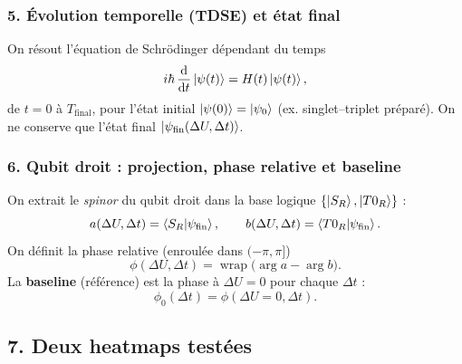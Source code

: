 \documentclass{article}
\begin{document}
\subsubsection*{5. Évolution temporelle (TDSE) et état final}
On résout l’équation de Schrödinger dépendant du temps
\[
i\hbar\,\dv{t}\ket{\psi(t)}=H(t)\ket{\psi(t)},
\]
de $t=0$ à $T_{\text{final}}$, pour l’état initial $\ket{\psi(0)}=\ket{\psi_0}$ (ex. singlet–triplet préparé).
On ne conserve que l’état final $\ket{\psi_{\text{fin}}(\Delta U,\Delta t)}$.

\subsubsection*{6. Qubit droit : projection, phase relative et baseline}
On extrait le \emph{spinor} du qubit droit dans la base logique $\{\ket{S_R},\ket{T0_R}\}$ :
\[
a(\Delta U,\Delta t)=\braket{S_R}{\psi_{\text{fin}}},\qquad
b(\Delta U,\Delta t)=\braket{T0_R}{\psi_{\text{fin}}}.
\]
On définit la phase relative (enroulée dans $(-\pi,\pi]$)
\[
\phi(\Delta U,\Delta t)=\operatorname{wrap}\!\big(\arg a-\arg b\big).
\]
La \textbf{baseline} (référence) est la phase à $\Delta U=0$ pour chaque $\Delta t$ :
\[
\phi_0(\Delta t)=\phi(\Delta U{=}0,\Delta t).
\]

\subsection*{7. Deux heatmaps testées}
\end{document}
